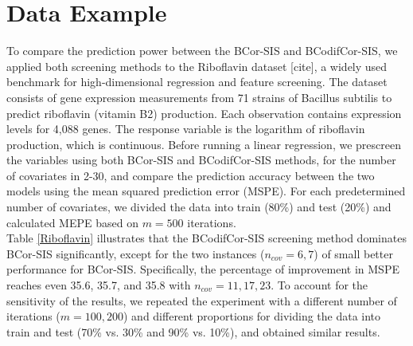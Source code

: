 \documentclass[11pt]{article}
\theoremstyle{definition}
\begin{document}
\section{Data Example}\label{Data_Example}
To compare the prediction power between the BCor-SIS and BCodifCor-SIS, we applied both screening methods to the Riboflavin dataset [cite], a widely used benchmark for high-dimensional regression and feature screening. The dataset consists of gene expression measurements from 71 strains of Bacillus subtilis to predict riboflavin (vitamin B2) production. Each observation contains expression levels for 4,088 genes. The response variable is the logarithm of riboflavin production, which is continuous. Before running a linear regression, we prescreen the variables using both BCor-SIS and BCodifCor-SIS methods, for the number of covariates in 2-30,
and compare the prediction accuracy between the two models using the mean squared prediction error (MSPE). For each predetermined number of covariates, we divided the data into train (80\%) and test (20\%) and calculated MEPE based on $m=500$ iterations. \\ 
Table \ref{Riboflavin} illustrates that the BCodifCor-SIS screening method dominates BCor-SIS significantly, except for the two instances ($n_{cov}=6,7$) of small better performance for BCor-SIS. Specifically, the percentage of improvement in MSPE reaches even 35.6, 35.7, and 35.8 with $n_{cov}=11, 17, 23$. To account for the sensitivity of the results, we repeated the experiment with a different number of iterations ($m=100, 200$) and different proportions for dividing the data into train and test (70\% vs. 30\%  and 90\% vs. 10\%), and obtained similar results.   
\end{document}
